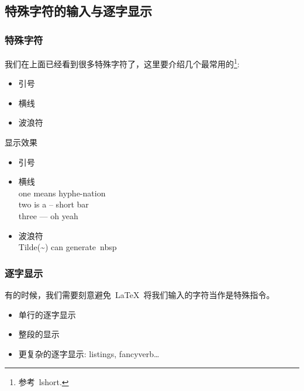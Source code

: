 \subsection{特殊字符的输入与逐字显示}

\begin{frame}
	\frametitle{特殊字符}
	我们在上面已经看到很多特殊字符了，这里要介绍几个最常用的\footnote{参考~lshort.}:
	\begin{overprint}
		\begin{itemize}
			\item<2-|alert@2> 引号
			
			\item<3-|alert@3> 横线
			
			\item<4-|alert@4> 波浪符
			
		\end{itemize}
		\begin{block}{显示效果}
			\begin{itemize}
				\item<6-> 引号\\
				\item<7-> 横线\\
					one means hyphe-nation\\
					two is a -- short bar\\
					three --- oh yeah\\
				\item<8-> 波浪符\\
					Tilde(\alert{\~{}}) can generate~nbsp
			\end{itemize}
		\end{block}
	\end{overprint}
\end{frame}

\begin{frame}
	\frametitle{逐字显示}
	有的时候，我们需要刻意避免~\LaTeX~将我们输入的字符当作是特殊指令。
	\begin{itemize}
		\item<2-|alert@2> 单行的逐字显示
		
		\item<2-|alert@3> 整段的显示
		
		\item<2-> 更复杂的逐字显示: listings, fancyverb\ldots
	\end{itemize}
\end{frame}

